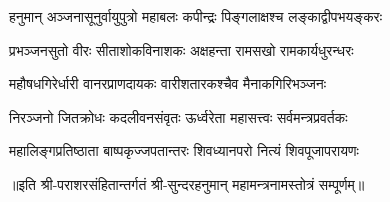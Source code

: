 

\twolineshloka
{हनुमान् अञ्जनासूनुर्वायुपुत्रो महाबलः}
{कपीन्द्रः पिङ्गलाक्षश्च लङ्काद्वीपभयङ्करः}

\twolineshloka
{प्रभञ्जनसुतो वीरः सीताशोकविनाशकः}
{अक्षहन्ता रामसखो रामकार्यधुरन्धरः}

\twolineshloka
{महौषधगिरेर्धारी वानरप्राणदायकः}
{वारीशतारकश्चैव मैनाकगिरिभञ्जनः}

\twolineshloka
{निरञ्जनो जितक्रोधः कदलीवनसंवृतः}
{ऊर्ध्वरेता महासत्त्वः सर्वमन्त्रप्रवर्तकः}

\twolineshloka
{महालिङ्गप्रतिष्ठाता बाष्पकृज्जपतान्तरः}
{शिवध्यानपरो नित्यं शिवपूजापरायणः}


॥इति श्री-पराशरसंहितान्तर्गतं श्री-सुन्दरहनुमान् महामन्त्रनामस्तोत्रं सम्पूर्णम्॥